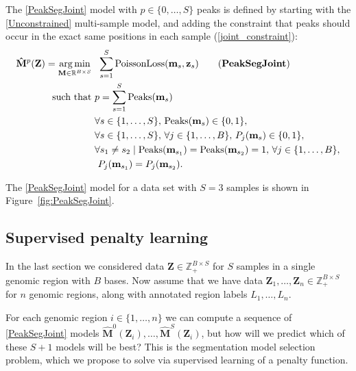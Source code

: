 \documentclass{article} %
\DeclareMathOperator*{\argmin}{arg\,min}
\DeclareMathOperator*{\Peaks}{Peaks}
\newcommand{\RR}{\mathbb R}
\newcommand{\ZZ}{\mathbb Z}
\begin{document}
The 
\ref{PeakSegJoint} model with $p\in\{0, \dots, S\}$ peaks is defined by
starting with the \ref{Unconstrained} multi-sample model, and adding
the constraint that peaks should occur in the exact same positions in
each sample (\ref{joint_constraint}):
\begin{align}
  \label{PeakSegJoint}
  \mathbf{\hat M}^p(\mathbf Z)  =
  \argmin_{\mathbf M\in\RR^{B\times S}} &\ \ 
  \sum_{s=1}^S 
  \text{PoissonLoss}(\mathbf m_s, \mathbf z_s) 
  \tag{\textbf{PeakSegJoint}}
  \\
  \text{such that} &\ p = \sum_{s=1}^S \Peaks(\mathbf m_s)
  \nonumber
  \\
  &\ \forall s\in\{1, \dots, S\},\, 
  \Peaks(\mathbf m_s)\in\{0, 1\},  
  \nonumber
  \\
  &\ \forall s\in\{1, \dots, S\},\,
  \forall j\in\{1, \dots, B\},\, P_j(\mathbf m_s) \in\{0, 1\},
  \label{joint_up_down}
  \\
  &\ \forall s_1\neq s_2\mid
  \nonumber
  \Peaks(\mathbf m_{s_1})=\Peaks(\mathbf  m_{s_2})=1,\,
  \forall j\in\{1, \dots, B\},\\
  &\ \ P_j(\mathbf m_{s_1}) = P_j(\mathbf m_{s_2}).
  \label{joint_constraint}
\end{align}

The 
\ref{PeakSegJoint} model for a data set with $S=3$ samples is shown in
Figure~\ref{fig:PeakSegJoint}.

\subsection{Supervised penalty learning}

In the last section we considered data $\mathbf Z\in\ZZ_+^{B\times S}$
for $S$ samples in a single genomic region with $B$ bases. Now assume
that we have data $\mathbf Z_1,\dots, \mathbf Z_n\in\ZZ_+^{B\times S}$
for $n$ genomic regions, along with annotated region labels
$L_1,\dots, L_n$. 

For each genomic region $i\in\{1,\dots,n\}$ we can compute a sequence
of \ref{PeakSegJoint} models $\mathbf{\hat M}^0(\mathbf Z_i),\dots,
\mathbf{\hat M}^S(\mathbf Z_i)$, but how will we predict which of
these $S+1$ models will be best?
This is the segmentation model selection problem, which we propose to
solve via supervised learning of a penalty function.
\end{document}

